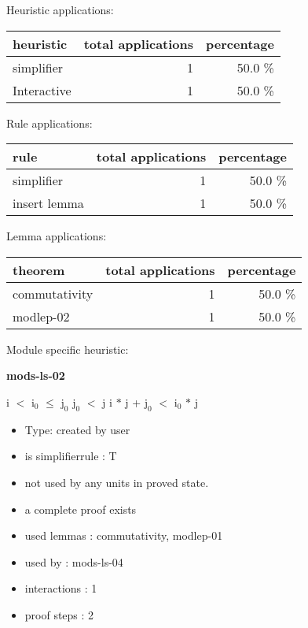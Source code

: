 \documentclass[a4paper]{article}
\begin{document}
\medskip


Heuristic applications:

\begin{supertabular}{l|r|r}
heuristic	& total applications & percentage \\ \hline
simplifier & 1 & 50.0 \% \\
Interactive & 1 & 50.0 \% \\

\end{supertabular}

Rule applications:

\begin{supertabular}{l|r|r}
rule	        & total applications & percentage \\ \hline
simplifier & 1 & 50.0 \% \\
insert lemma & 1 & 50.0 \% \\

\end{supertabular}

Lemma applications:

\begin{supertabular}{l|r|r}
theorem	        & total applications & percentage \\ \hline
commutativity & 1 & 50.0 \% \\
modlep-02 & 1 & 50.0 \% \\

\end{supertabular}

Module specific heuristic:

\pagebreak

{\LARGE\bf mods-ls-02}\label{lemma-mods-ls-02}

\medskip

 \Fol i $<$ $\mbox{i}_{0}$  $\le$ $\mbox{j}_{0}$ \And $\mbox{j}_{0}$ $<$ j \Imp i $*$ j + $\mbox{j}_{0}$ $<$ $\mbox{i}_{0}$ $*$ j

\begin{itemize}

\item Type: created by user

\item is simplifierrule : T
\item not used by any units in proved state.
\item       a complete proof exists
\item       used lemmas  : commutativity, modlep-01
\item       used by      : mods-ls-04
\item       interactions : 1
\item       proof steps  : 2
\end{itemize}
\end{document}

